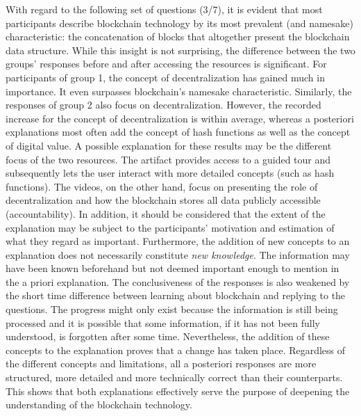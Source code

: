 With regard to the following set of questions (3/7), it is evident that most participants describe blockchain technology by its most prevalent (and namesake) characteristic: the concatenation of blocks that altogether present the blockchain data structure. While this insight is not surprising, the difference between the two groups' responses before and after accessing the resources is significant. For participants of group 1, the concept of decentralization has gained much in importance. It even surpasses blockchain's namesake characteristic. Similarly, the responses of group 2 also focus on decentralization. However, the recorded increase for the concept of decentralization is within average, whereas a posteriori explanations most often add the concept of hash functions as well as the concept of digital value. A possible explanation for these results may be the different focus of the two resources. The artifact provides access to a guided tour and subsequently lets the user interact with more detailed concepts (such as hash functions). The videos, on the other hand, focus on presenting the role of decentralization and how the blockchain stores all data publicly accessible (accountability). In addition, it should be considered that the extent of the explanation may be subject to the participants' motivation and estimation of what they regard as important. Furthermore, the addition of new concepts to an explanation does not necessarily constitute \textit{new knowledge}. The information may have been known beforehand but not deemed important enough to mention in the a priori explanation. The conclusiveness of the responses is also weakened by the short time difference between learning about blockchain and replying to the questions. The progress might only exist because the information is still being processed and it is possible that some information, if it has not been fully understood, is forgotten after some time. Nevertheless, the addition of these concepts to the explanation proves that a change has taken place. Regardless of the different concepts and limitations, all a posteriori responses are more structured, more detailed and more technically correct than their counterparts. This shows that both explanations effectively serve the purpose of deepening the understanding of the blockchain technology. 

